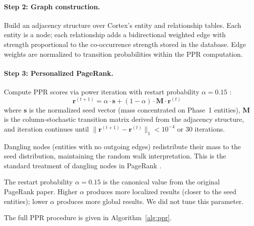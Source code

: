 \documentclass[11pt]{article}
\begin{document}
\paragraph{Step 2: Graph construction.}
Build an adjacency structure over Cortex's entity and relationship
tables.  Each entity is a node; each relationship adds a bidirectional
weighted edge with strength proportional to the co-occurrence strength
stored in the database.  Edge weights are normalized to transition
probabilities within the PPR computation.

\paragraph{Step 3: Personalized PageRank.}
Compute PPR scores via power iteration with restart probability
$\alpha = 0.15$ \citep{Brin1998}:
\begin{equation}
\mathbf{r}^{(t+1)} = \alpha \cdot \mathbf{s} + (1 - \alpha) \cdot \mathbf{M} \cdot \mathbf{r}^{(t)}
\label{eq:ppr}
\end{equation}
where $\mathbf{s}$ is the normalized seed vector (mass concentrated
on Phase~1 entities), $\mathbf{M}$ is the column-stochastic
transition matrix derived from the adjacency structure, and iteration
continues until $\|\mathbf{r}^{(t+1)} - \mathbf{r}^{(t)}\|_1 < 10^{-4}$
or 30 iterations.

Dangling nodes (entities with no outgoing edges) redistribute their
mass to the seed distribution, maintaining the random walk
interpretation.  This is the standard treatment of dangling nodes in
PageRank \citep{Langville2005}.

The restart probability $\alpha = 0.15$ is the canonical value from
the original PageRank paper.  Higher $\alpha$ produces more localized
results (closer to the seed entities); lower $\alpha$ produces more
global results.  We did not tune this parameter.

The full PPR procedure is given in Algorithm~\ref{alg:ppr}.
\end{document}
